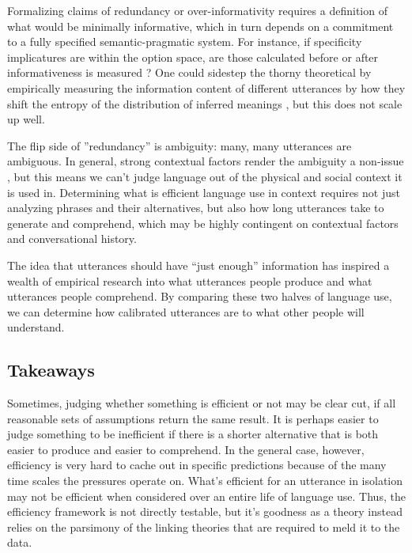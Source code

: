 \documentclass[]{article}
\begin{document}
Formalizing claims of redundancy or over-informativity requires a definition of what would be minimally informative, which in turn depends on a commitment to a fully specified semantic-pragmatic system. For instance, if specificity implicatures are within the option space, are those calculated before or after informativeness is measured \citep{bergen}? One could sidestep the thorny theoretical by empirically measuring the information content of different utterances by how they shift the entropy of the distribution of inferred meanings \citep{degen20200406}, but this does not scale up well. 

The flip side of ''redundancy'' is ambiguity: many, many utterances are ambiguous. In general, strong contextual factors render the ambiguity a non-issue \citep{piantadosi2012}, but this means we can't judge language out of the physical and social context it is used in. Determining what is efficient language use in context requires not just analyzing phrases and their alternatives, but also how long utterances take to generate and comprehend, which may be highly contingent on contextual factors and conversational history. 

The idea that utterances should have ``just enough'' information has inspired a wealth of empirical research into what utterances people produce and what utterances people comprehend. By comparing these two halves of language use, we can determine how calibrated utterances are to what other people will understand. 


\subsection{Takeaways}
Sometimes, judging whether something is efficient or not may be clear cut, if all reasonable sets of assumptions return the same result. It is perhaps easier to judge something to be inefficient if there is a shorter alternative that is both easier to produce and easier to comprehend. In the general case, however, efficiency is very hard to cache out in specific predictions because of the many time scales the pressures operate on. What's efficient for an utterance in isolation may not be efficient when considered over an entire life of language use. Thus, the efficiency framework is not directly testable, but it's goodness as a theory instead relies on the parsimony of the linking theories that are required to meld it to the data. 
\end{document}
